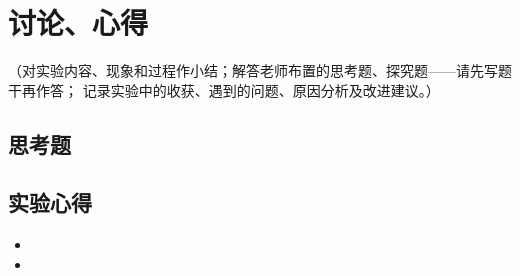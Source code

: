 \documentclass[UTF8,AutoFakeBold]{article}%
\begin{document}
\section{讨论、心得}
（对实验内容、现象和过程作小结；解答老师布置的思考题、探究题——请先写题干再作答；
记录实验中的收获、遇到的问题、原因分析及改进建议。）

\subsection{思考题}

\subsection{实验心得}
\begin{itemize}[label=\textbullet]
  \item 
  \item 
\end{itemize}
\end{document}
